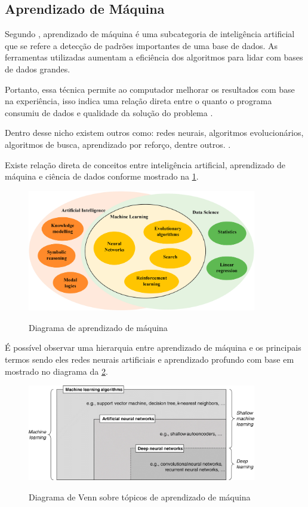 \documentclass[
	12pt,				%
	openright,			%
	twoside,			%
	a4paper,			%
	english,			%
	french,				%
	spanish,			%
	brazil				%
	]{abntex2}
\begin{document}
\subsection{Aprendizado de Máquina}


Segundo , aprendizado de máquina é uma subcategoria de inteligência artificial que se refere  a detecção de padrões importantes de uma base de dados. As ferramentas utilizadas aumentam a eficiência dos algoritmos para lidar com bases de dados grandes.

Portanto, essa técnica permite ao computador melhorar os resultados com base na experiência, isso indica uma relação direta entre o quanto o programa consumiu de dados e qualidade da solução do problema \cite{ml_explicado}. 

Dentro desse nicho existem outros como: redes neurais, algoritmos evolucionários, algoritmos de busca, aprendizado por reforço, dentre outros. \cite{ml_oil_gas_industry}.

Existe relação direta de conceitos entre inteligência artificial, aprendizado de máquina e ciência de dados conforme mostrado na \cref{fig:diagrama_ia}.

\begin{figure}[H]
	\caption{Diagrama de aprendizado de máquina}
	\centering %
	\includegraphics[width=10cm]{figures/diagrama_ia.jpg} %
	\label{fig:diagrama_ia}
\end{figure}

É possível observar uma hierarquia entre aprendizado de máquina e os principais termos sendo eles redes neurais artificiais e aprendizado profundo com base em  mostrado no diagrama da \cref{fig:diagrama_ann}.

\begin{figure}[H]
	\caption{Diagrama de Venn sobre tópicos de aprendizado de máquina}
	\centering %
	\includegraphics[width=10cm]{figures/diagrama_ann.jpg} %
	\label{fig:diagrama_ann}
\end{figure}
\end{document}
